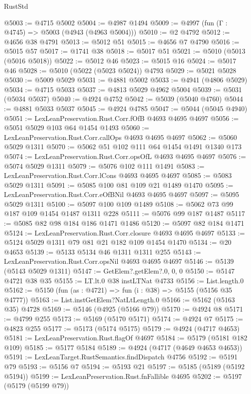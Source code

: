 \begin{lexlean}{RustStd}
\begin{coremodule}
@5003 := @4715 @5002
@5004 := @4987 @1494
@5009 := @4997 (fun (Γ : @4745) => @5003 (@4943 (@4963 @5004)))
@5010 := @2 @4792
@5012 := @4656 @38 @4791
@5013 := @5012 @51
@5015 := @4656 @7 @4790
@5016 := @5015 @57
@5017 := @1741 @38
@5018 := @5017 @51
@5021 := @5010 (@5013 (@5016 @5018))
@5022 := @5012 @46
@5023 := @5015 @16
@5024 := @5017 @46
@5028 := @5010 (@5022 (@5023 @5024)) @4793
@5029 := @5021 @5028
@5030 := @5009 @5029
@5031 := @4881 @5002
@5033 := @4941 (@4806 @5029)
@5034 := @4715 @5033
@5037 := @4813 @5029 @4962 @5004
@5039 := @5031 (@5034 @5037)
@5040 := @4924 @4752
@5042 := @5039 (@5040 @4760)
@5044 := @4881 @5033 @5037
@5045 := @4924 @4785
@5047 := @5044 (@5045 @4940)
@5051 := LexLeanPreservation.Rust.Corr.fOfB @4693 @4695 @4697
@5056 := @5051 @5029 @103 @64 @1454 @1493
@5060 := LexLeanPreservation.Rust.Corr.callOps @4693 @4695 @4697
@5062 := @5060 @5029 @1311
@5070 := @5062 @51 @102 @111 @64 @1454 @1491 @1340 @173
@5074 := LexLeanPreservation.Rust.Corr.opsOfL @4693 @4695 @4697
@5076 := @5074 @5029 @1311
@5079 := @5076 @102 @111 @1491
@5083 := LexLeanPreservation.Rust.Corr.lCons @4693 @4695 @4697
@5085 := @5083 @5029 @1311
@5091 := @5085 @100 @81 @109 @21 @1489 @1470
@5095 := LexLeanPreservation.Rust.Corr.eOfBNil @4693 @4695 @4697
@5097 := @5095 @5029 @1311
@5100 := @5097 @100 @109 @1489
@5108 := @5062 @73 @99 @187 @109 @1454 @1487 @1311 @228
@5111 := @5076 @99 @187 @1487
@5117 := @5085 @82 @98 @184 @186 @1471 @1486
@5120 := @5097 @82 @184 @1471
@5124 := LexLeanPreservation.Rust.Corr.closure @4693 @4695 @4697
@5133 := @5124 @5029 @1311 @79 @81 @21 @182 @109 @1454 @1470
@5134 := @20 @4653
@5139 := @5133 @5134 @46 @1311 @1311 @255
@5143 := LexLeanPreservation.Rust.Corr.opsNil @4693 @4695 @4697
@5146 := @5139 (@5143 @5029 @1311)
@5147 := GetElem?.getElem?.{0, 0, 0}
@5150 := @5147 @4721 @38 @35
@5155 := LT.lt.{0} @38 instLTNat @4733
@5156 := List.length.{0}
@5162 := @5150 (fun (as : @4721) => fun (i : @38) => @5155 (@5156 @35 @4777))
@5163 := List.instGetElem?NatLtLength.{0}
@5166 := @5162 (@5163 @35) @4728
@5169 := @5146 (@4925 (@5166 @79))
@5170 := @4924 @8
@5171 := @4799 @255
@5173 := @5169 (@5170 @5171)
@5174 := @4924 @7
@5175 := @4823 @255
@5177 := @5173 (@5174 @5175)
@5179 := @4924 (@4717 @4653)
@5181 := LexLeanPreservation.Rust.flagOf @4697
@5184 := @5179 (@5181 @182 @109)
@5185 := @5177 @5184
@5189 := @4924 (@4717 (@4649 @4653 @4653))
@5191 := LexLeanTarget.RustSemantics.findDispatch @4756
@5192 := @5191 @79
@5193 := @5156 @7
@5194 := @5193 @21
@5197 := @5185 (@5189 (@5192 @5194))
@5199 := LexLeanPreservation.Rust.fnFallible @4695
@5202 := @5197 (@5179 (@5199 @79))

\end{coremodule}
\end{lexlean}

